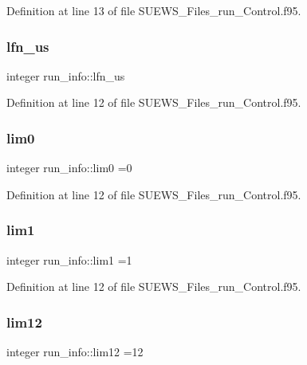Definition at line 13 of file S\+U\+E\+W\+S\+\_\+\+Files\+\_\+run\+\_\+\+Control.\+f95.

\mbox{\label{namespacerun__info_ab21dc24ae87c9094754723447a6c94e5}} 
\subsubsection{\texorpdfstring{lfn\+\_\+us}{lfn\_us}}
{\footnotesize\ttfamily integer run\+\_\+info\+::lfn\+\_\+us}



Definition at line 12 of file S\+U\+E\+W\+S\+\_\+\+Files\+\_\+run\+\_\+\+Control.\+f95.

\mbox{\label{namespacerun__info_a4406caf0abae1b67ad05c7ed0c7904c0}} 
\subsubsection{\texorpdfstring{lim0}{lim0}}
{\footnotesize\ttfamily integer run\+\_\+info\+::lim0 =0}



Definition at line 12 of file S\+U\+E\+W\+S\+\_\+\+Files\+\_\+run\+\_\+\+Control.\+f95.

\mbox{\label{namespacerun__info_adc3a55251266df823d3449b67005bade}} 
\subsubsection{\texorpdfstring{lim1}{lim1}}
{\footnotesize\ttfamily integer run\+\_\+info\+::lim1 =1}



Definition at line 12 of file S\+U\+E\+W\+S\+\_\+\+Files\+\_\+run\+\_\+\+Control.\+f95.

\mbox{\label{namespacerun__info_a635c9fcab621a64612a513a423762d84}} 
\subsubsection{\texorpdfstring{lim12}{lim12}}
{\footnotesize\ttfamily integer run\+\_\+info\+::lim12 =12}



